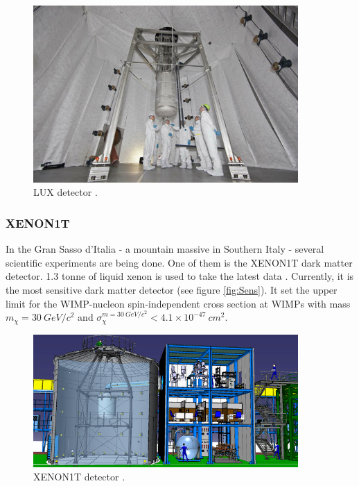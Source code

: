 \documentclass{article}
\begin{document}

\begin{figure}[h]
    \centering
    \includegraphics[width=0.9\textwidth]{lux.jpg}
    \caption{LUX detector \cite{PhysWorld}.}
    \label{fig:LUX}
\end{figure}

\subsubsection{XENON1T}
In the Gran Sasso d'Italia - a mountain massive in Southern Italy - several scientific experiments are being done. One of them is the XENON1T dark matter detector. 1.3 tonne of liquid xenon is used to take the latest data \cite{Aprile:2018dbl}. Currently, it is the most sensitive dark matter detector (see figure \ref{fig:Sens}). It set the upper limit for the WIMP-nucleon spin-independent cross section at WIMPs with mass $m_\chi =30\ GeV/c^2$ and $\sigma_\chi^{m=30\ GeV/c^2}<4.1\times 10^{-47}\ cm^2$.

\begin{figure}[h]
    \centering
    \includegraphics[width=0.9\textwidth]{Xenon1T.png}
    \caption{XENON1T detector \cite{Perdue}.}
    \label{fig:XENON1T}
\end{figure}
\end{document}
